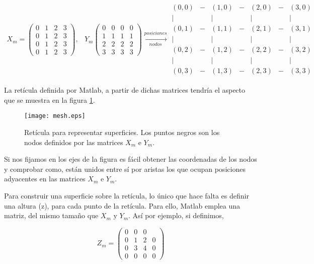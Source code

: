 \begin{align*}
X_m=\begin{pmatrix}
0&1&2&3\\ 
0&1&2&3\\
0&1&2&3\\
0&1&2&3
\end{pmatrix},& Y_m\begin{pmatrix}
0&0&0&0\\
1&1&1&1\\
2&2&2&2\\
3&3&3&3
\end{pmatrix}\xrightarrow[nodos]{posiciones}\begin{matrix}
(0,0)&-&(1,0)&-&(2,0)&-&(3,0)\\
\vert&&\vert&&\vert&&\vert\\ 
(0,1)&-&(1,1)&-&(2,1)&-&(3,1)\\
\vert&&\vert&&\vert&&\vert\\
(0,2)&-&(1,2)&-&(2,2)&-&(3,2)\\
\vert&&\vert&&\vert&&\vert\\
(0,3)&-&(1,3)&-&(2,3)&-&(3,3)
\end{matrix}
\end{align*}

La retícula definida por Matlab, a partir de dichas matrices tendría el aspecto que se muestra en la figura \ref{fig:mesh}. 

\begin{figure}[h]
\centering
\texttt{[image: mesh.eps]}
\caption{Retícula para representar superficies. Los puntos negros son los nodos definidos por las matrices $X_m$ e $Y_m$.}
\label{fig:mesh}
\end{figure}

Si nos fijamos en los ejes de la figura es fácil obtener las coordenadas de los nodos y comprobar como, están unidos entre sí por aristas los que ocupan posiciones adyacentes en las matrices $X_m$ e $Y_m$.

Para construir una superficie sobre la retícula, lo único que hace falta es definir una altura (z), para cada punto de la retícula. Para ello, Matlab emplea una matriz, del mismo tamaño que $X_m$ y $Y_m$. Así por ejemplo, si definimos,

\begin{equation*}
Z_m=\begin{pmatrix}
0&0&0&\\ 
0&1&2&0\\
0&3&4&0\\
0&0&0&0
\end{pmatrix}
\end{equation*}

